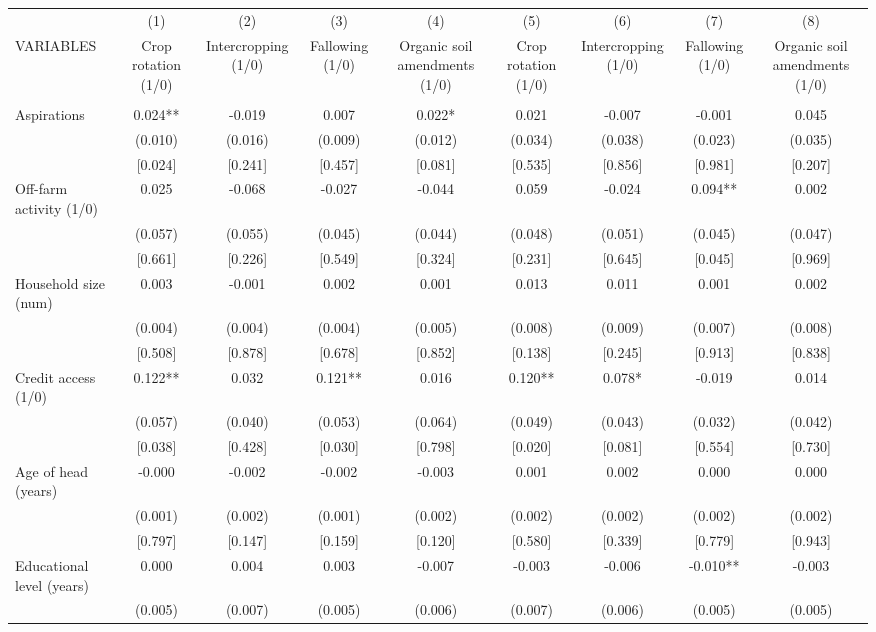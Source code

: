 \documentclass[]{article}
\begin{document}
\begin{tabular}{lcccccccc} \hline
 & (1) & (2) & (3) & (4) & (5) & (6) & (7) & (8) \\
VARIABLES & Crop rotation (1/0) & Intercropping (1/0) & Fallowing (1/0) & Organic soil amendments (1/0) & Crop rotation (1/0) & Intercropping (1/0) & Fallowing (1/0) & Organic soil amendments (1/0) \\ \hline
 &  &  &  &  &  &  &  &  \\
Aspirations & 0.024** & -0.019 & 0.007 & 0.022* & 0.021 & -0.007 & -0.001 & 0.045 \\
 & (0.010) & (0.016) & (0.009) & (0.012) & (0.034) & (0.038) & (0.023) & (0.035) \\
 & [0.024] & [0.241] & [0.457] & [0.081] & [0.535] & [0.856] & [0.981] & [0.207] \\
Off-farm activity (1/0) & 0.025 & -0.068 & -0.027 & -0.044 & 0.059 & -0.024 & 0.094** & 0.002 \\
 & (0.057) & (0.055) & (0.045) & (0.044) & (0.048) & (0.051) & (0.045) & (0.047) \\
 & [0.661] & [0.226] & [0.549] & [0.324] & [0.231] & [0.645] & [0.045] & [0.969] \\
Household size (num) & 0.003 & -0.001 & 0.002 & 0.001 & 0.013 & 0.011 & 0.001 & 0.002 \\
 & (0.004) & (0.004) & (0.004) & (0.005) & (0.008) & (0.009) & (0.007) & (0.008) \\
 & [0.508] & [0.878] & [0.678] & [0.852] & [0.138] & [0.245] & [0.913] & [0.838] \\
Credit access (1/0) & 0.122** & 0.032 & 0.121** & 0.016 & 0.120** & 0.078* & -0.019 & 0.014 \\
 & (0.057) & (0.040) & (0.053) & (0.064) & (0.049) & (0.043) & (0.032) & (0.042) \\
 & [0.038] & [0.428] & [0.030] & [0.798] & [0.020] & [0.081] & [0.554] & [0.730] \\
Age of head (years) & -0.000 & -0.002 & -0.002 & -0.003 & 0.001 & 0.002 & 0.000 & 0.000 \\
 & (0.001) & (0.002) & (0.001) & (0.002) & (0.002) & (0.002) & (0.002) & (0.002) \\
 & [0.797] & [0.147] & [0.159] & [0.120] & [0.580] & [0.339] & [0.779] & [0.943] \\
Educational level (years) & 0.000 & 0.004 & 0.003 & -0.007 & -0.003 & -0.006 & -0.010** & -0.003 \\
 & (0.005) & (0.007) & (0.005) & (0.006) & (0.007) & (0.006) & (0.005) & (0.005) \\

\end{tabular}
\end{document}
